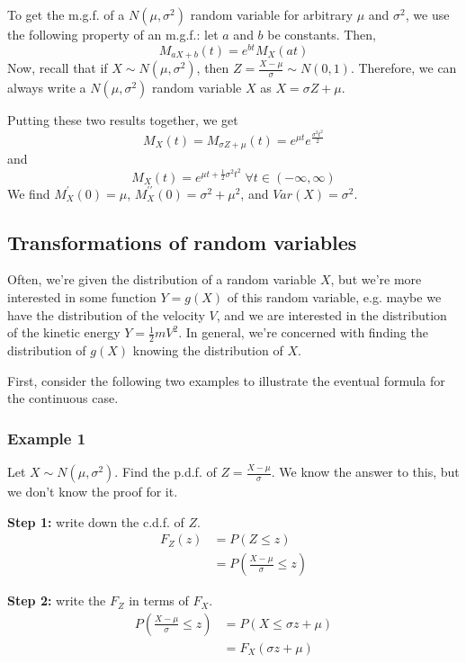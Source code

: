 \documentclass[12pt]{article}
\begin{document}
To get the m.g.f. of a $N(\mu, \sigma^2)$ random variable for arbitrary $\mu$ and $\sigma^2$, we use the following property of an m.g.f.: let $a$ and $b$ be constants. Then,
\[
    M_{aX + b} (t) = e^{bt} M_X (at)
\]
Now, recall that if $X \sim N(\mu, \sigma^2)$, then $Z = \frac{X-\mu}{\sigma} \sim N(0,1)$. Therefore, we can always write a $N(\mu, \sigma^2)$ random variable $X$ as $X = \sigma Z + \mu$.

Putting these two results together, we get
\[
    M_X (t) = M_{\sigma Z + \mu} (t) = e^{\mu t} e^{\frac{\sigma^2 t^2}{2}}
\]
and
\[
    M_X (t) = e^{\mu t + \frac{1}{2} \sigma^2 t^2} \; \forall t \in (-\infty, \infty)
\]
We find $M_X^{\prime} (0) = \mu$, $M_X^{\prime \prime} (0) = \sigma^2 + \mu^2$, and $Var(X) = \sigma^2$.

\subsection{Transformations of random variables}
Often, we're given the distribution of a random variable $X$, but we're more interested in some function $Y = g(X)$ of this random variable, e.g. maybe we have the distribution of the velocity $V$, and we are interested in the distribution of the kinetic energy $Y = \frac{1}{2} m V^2$. In general, we're concerned with finding the distribution of $g(X)$ knowing the distribution of $X$. 

First, consider the following two examples to illustrate the eventual formula for the continuous case. 

\subsubsection{Example 1}
Let $X \sim N(\mu, \sigma^2)$. Find the p.d.f. of $Z = \frac{X - \mu}{\sigma}$. We know the answer to this, but we don't know the proof for it.

\textbf{Step 1:} write down the c.d.f. of $Z$.
\begin{align*}
    F_Z (z) &= P(Z \leq z) \\
        &= P( \frac{X - \mu}{\sigma} \leq z)
\end{align*}

\textbf{Step 2:} write the $F_Z$ in terms of $F_X$.
\begin{align*} 
    P(\frac{X - \mu}{\sigma} \leq z) &= P(X \leq \sigma z + \mu) \\
        &= F_X (\sigma z + \mu)
\end{align*}
\end{document}
